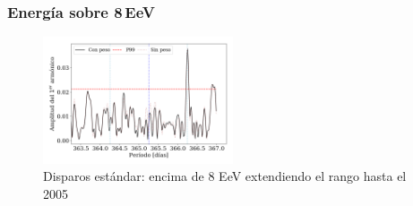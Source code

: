 \subsubsection{Energía sobre 8\,EeV}


\begin{figure}[H]
	\centering
	\includegraphics[width=0.5\textwidth]{Graficos/2019_Main_Array_8_EeV_con_vs_sin_peso_extended.png}
	\caption{Disparos estándar: encima de 8 EeV extendiendo el rango hasta el 2005}
	\label{fig:8w_extended}
\end{figure}
